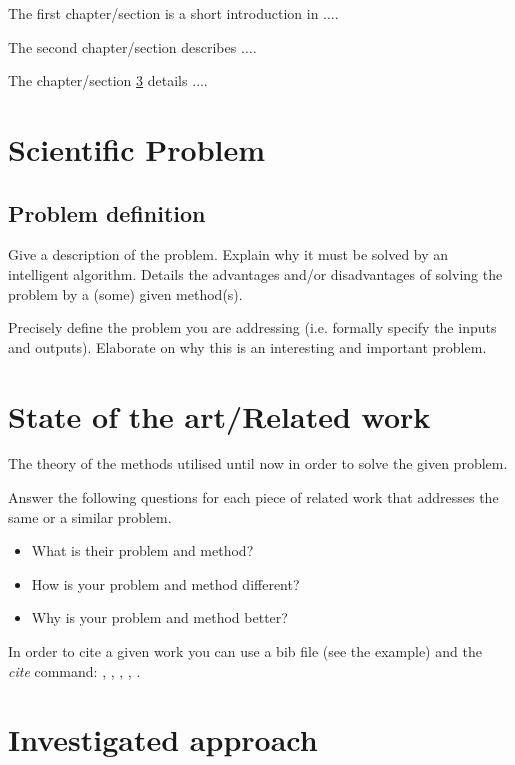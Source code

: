 \documentclass[runningheads,a4paper,11pt]{report}
\begin{document}
The first chapter/section is a short introduction in $\ldots$.

The second chapter/section describes $\ldots$.

The chapter/section \ref{chapter:proposedApproach} details $\ldots$.



\chapter{Scientific Problem}
\label{section:scientificProblem}


\section{Problem definition}
\label{section:problemDefinition}

Give a description of the problem.
Explain why it must be solved by an intelligent algorithm. 
Details the advantages and/or disadvantages of solving the problem by a (some) given method(s).

Precisely define the problem you are addressing (i.e. formally specify the inputs and outputs). Elaborate on why this is an interesting and important problem.




\chapter{State of the art/Related work}
\label{chapter:stateOfArt}


The theory of the methods utilised until now in order to solve the given problem.

Answer the following questions for each piece of related work that addresses the same or a similar problem. 
\begin{itemize}
	\item What is their problem and method? 
	\item How is your problem and method different? 
	\item Why is your problem and method better?
\end{itemize}

In order to cite a given work you can use a bib file (see the example) and the $\ $ \textit{cite} command:
\cite{kennedy1}, \cite{Koh06}, \cite{Berlekamp82}, \cite{Storn95}, \cite{firefox}.



\chapter{Investigated approach}
\label{chapter:proposedApproach}
\end{document}
